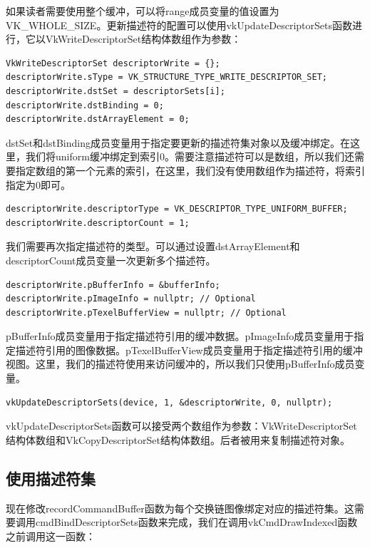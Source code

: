 \documentclass{ctexart}
\begin{document}
如果读者需要使用整个缓冲，可以将range成员变量的值设置为VK\_WHOLE\_SIZE。更新描述符的配置可以使用vkUpdateDescriptorSets函数进行，它以VkWriteDescriptorSet结构体数组作为参数：

\begin{lstlisting}[language={[ANSI]C}]
VkWriteDescriptorSet descriptorWrite = {};
descriptorWrite.sType = VK_STRUCTURE_TYPE_WRITE_DESCRIPTOR_SET;
descriptorWrite.dstSet = descriptorSets[i];
descriptorWrite.dstBinding = 0;
descriptorWrite.dstArrayElement = 0;
\end{lstlisting}

dstSet和dstBinding成员变量用于指定要更新的描述符集对象以及缓冲绑定。在这里，我们将uniform缓冲绑定到索引0。需要注意描述符可以是数组，所以我们还需要指定数组的第一个元素的索引，在这里，我们没有使用数组作为描述符，将索引指定为0即可。

\begin{lstlisting}[language={[ANSI]C}]
descriptorWrite.descriptorType = VK_DESCRIPTOR_TYPE_UNIFORM_BUFFER;
descriptorWrite.descriptorCount = 1;
\end{lstlisting}

我们需要再次指定描述符的类型。可以通过设置dstArrayElement和descriptorCount成员变量一次更新多个描述符。

\begin{lstlisting}[language={[ANSI]C}]
descriptorWrite.pBufferInfo = &bufferInfo;
descriptorWrite.pImageInfo = nullptr; // Optional
descriptorWrite.pTexelBufferView = nullptr; // Optional
\end{lstlisting}

pBufferInfo成员变量用于指定描述符引用的缓冲数据。pImageInfo成员变量用于指定描述符引用的图像数据。pTexelBufferView成员变量用于指定描述符引用的缓冲视图。这里，我们的描述符使用来访问缓冲的，所以我们只使用pBufferInfo成员变量。

\begin{lstlisting}[language={[ANSI]C}]
vkUpdateDescriptorSets(device, 1, &descriptorWrite, 0, nullptr);
\end{lstlisting}

vkUpdateDescriptorSets函数可以接受两个数组作为参数：VkWriteDescriptorSet结构体数组和VkCopyDescriptorSet结构体数组。后者被用来复制描述符对象。

\subsection{使用描述符集}

现在修改recordCommandBuffer函数为每个交换链图像绑定对应的描述符集。这需要调用cmdBindDescriptorSets函数来完成，我们在调用vkCmdDrawIndexed函数之前调用这一函数：
\end{document}
